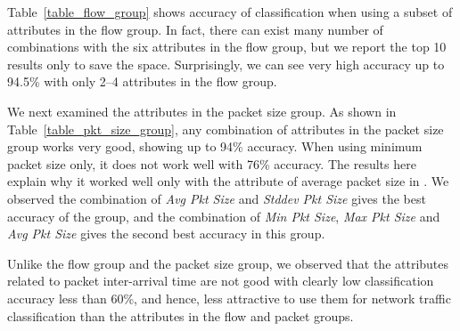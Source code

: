 \documentclass[conference]{IEEEtran}
\begin{document}
Table~\ref{table_flow_group} shows accuracy of classification when using a subset of attributes in the flow group.
In fact, there can exist many number of combinations with the six attributes in the flow group, but we report the top 10 results only to save the space. 
Surprisingly, we can see very high accuracy up to 94.5\% with only 2--4 attributes in the flow group.
 
We next examined the attributes in the packet size group.
As shown in Table~\ref{table_pkt_size_group}, any combination of attributes in the packet size group works very good, showing up to 94\% accuracy.
When using minimum packet size only, it does not work well with 76\% accuracy.
The results here explain why it worked well only with the attribute of average packet size in \cite{Bernaille:2006:EAI:1368436.1368445}. 
We observed the combination of \emph{Avg Pkt Size} and \emph{Stddev Pkt Size} gives the best accuracy of the group, and the combination of \emph{Min Pkt Size}, \emph{Max Pkt Size} and \emph{Avg Pkt Size} gives the second best accuracy in this group.

Unlike the flow group and the packet size group, we observed that the attributes related to packet inter-arrival time are not good with clearly low classification accuracy less than 60\%, and hence, less attractive to use them for network traffic classification than the attributes in the flow and packet groups.

\end{document}
